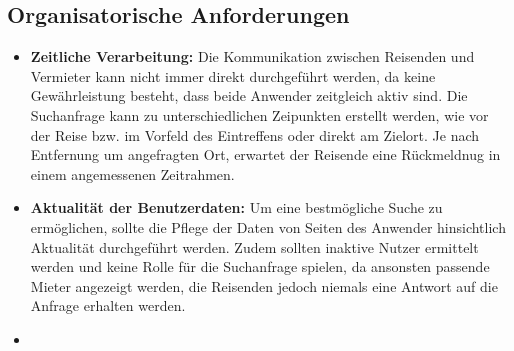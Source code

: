 \subsection{Organisatorische Anforderungen}          
\begin{itemize}
   \item
   \textbf{Zeitliche Verarbeitung:} Die Kommunikation zwischen Reisenden und Vermieter kann nicht immer direkt durchgeführt werden, da keine Gewährleistung besteht, dass beide Anwender zeitgleich aktiv sind. Die Suchanfrage kann zu unterschiedlichen Zeipunkten erstellt werden, wie vor der Reise bzw. im Vorfeld des Eintreffens oder direkt am Zielort. Je nach Entfernung um angefragten Ort, erwartet der Reisende eine Rückmeldnug in einem angemessenen Zeitrahmen.

   \item 
   \textbf{Aktualität der Benutzerdaten:} Um eine bestmögliche Suche zu ermöglichen, sollte die Pflege der Daten von Seiten des Anwender hinsichtlich Aktualität durchgeführt werden. Zudem sollten inaktive Nutzer ermittelt werden und keine Rolle für die Suchanfrage spielen, da ansonsten passende Mieter angezeigt werden, die Reisenden jedoch niemals eine Antwort auf die Anfrage erhalten werden.

   \item
   \textbf{}

\end{itemize}
